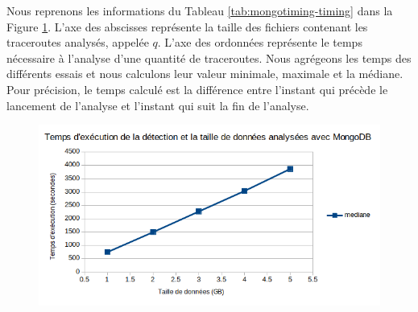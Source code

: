 Nous reprenons les informations du Tableau \ref{tab:mongotiming-timing} dans la Figure \ref{fig:mongodbtiming}. L'axe  des abscisses représente la taille des fichiers contenant les traceroutes  analysés, appelée  $q$. L'axe  des ordonnées  représente le temps nécessaire à l'analyse d'une quantité  de traceroutes. Nous agrégeons les temps des différents essais et nous calculons  leur valeur minimale, maximale et la médiane.
Pour précision, le temps calculé est la différence entre l'instant  qui précède le lancement de l'analyse et l'instant qui suit la fin de l'analyse.

\begin{figure}[h]
	\centering
	\captionsetup{justification=centering}
	\includegraphics[width=0.7\linewidth]{illustrations/mongoDBtiming_0}
	\caption{}
	\label{fig:mongodbtiming}
\end{figure}










